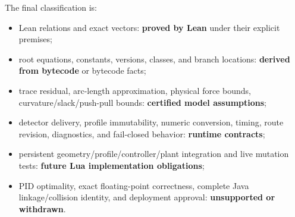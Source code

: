 \documentclass[10pt,a4paper]{article}
\begin{document}
The final classification is:
\begin{itemize}
 \item Lean relations and exact vectors: \textbf{proved by Lean} under their
 explicit premises;
 \item root equations, constants, versions, classes, and branch locations:
 \textbf{derived from bytecode} or bytecode facts;
 \item trace residual, arc-length approximation, physical force bounds,
 curvature/slack/push-pull bounds: \textbf{certified model assumptions};
 \item detector delivery, profile immutability, numeric conversion, timing,
 route revision, diagnostics, and fail-closed behavior: \textbf{runtime
 contracts};
 \item persistent geometry/profile/controller/plant integration and live
 mutation tests: \textbf{future Lua implementation obligations};
 \item PID optimality, exact floating-point correctness, complete Java
 linkage/collision identity, and deployment approval: \textbf{unsupported or
 withdrawn}.
\end{itemize}

\begin{center}
\end{center}
\end{document}
